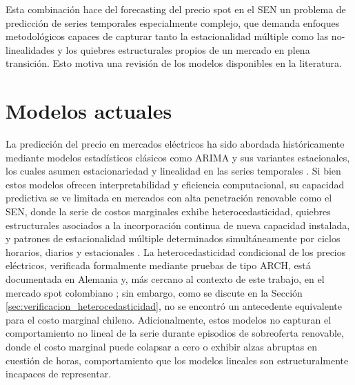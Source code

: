Esta combinación hace del forecasting del precio spot en el SEN un problema de predicción de series temporales especialmente complejo, que demanda enfoques metodológicos capaces de capturar tanto la estacionalidad múltiple como las no-linealidades y los quiebres estructurales propios de un mercado en plena transición. Esto motiva una revisión de los modelos disponibles en la literatura.

\section{Modelos actuales}

La predicción del precio en mercados eléctricos ha sido abordada históricamente mediante modelos estadísticos clásicos como ARIMA y sus variantes estacionales, los cuales asumen estacionariedad y linealidad en las series temporales \cite{weron}. Si bien estos modelos ofrecen interpretabilidad y eficiencia computacional, su capacidad predictiva se ve limitada en mercados con alta penetración renovable como el SEN, donde la serie de costos marginales exhibe heterocedasticidad, quiebres estructurales asociados a la incorporación continua de nueva capacidad instalada, y patrones de estacionalidad múltiple determinados simultáneamente por ciclos horarios, diarios y estacionales \cite{weron}. La heterocedasticidad condicional de los precios eléctricos, verificada formalmente mediante pruebas de tipo ARCH, está documentada en Alemania \cite{BenhmadPercebois2018, FletenParaschivSchurle2013} y, más cercano al contexto de este trabajo, en el mercado spot colombiano \cite{BelloBeltran2010}; sin embargo, como se discute en la Sección \ref{sec:verificacion_heterocedasticidad}, no se encontró un antecedente equivalente para el costo marginal chileno. Adicionalmente, estos modelos no capturan el comportamiento no lineal de la serie durante episodios de sobreoferta renovable, donde el costo marginal puede colapsar a cero o exhibir alzas abruptas en cuestión de horas, comportamiento que los modelos lineales son estructuralmente incapaces de representar.

